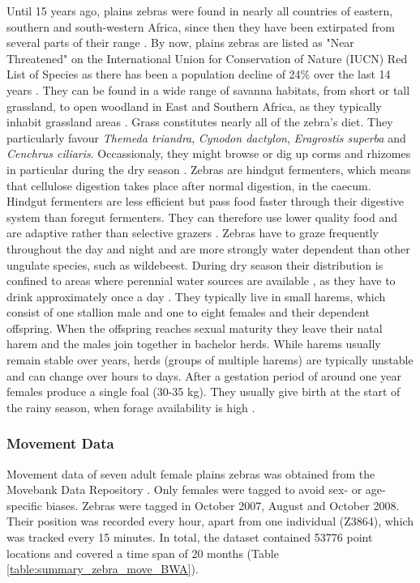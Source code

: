\documentclass[12pt,a4paper, twoside, english]{article}
\begin{document}
Until 15 years ago, plains zebras were found in nearly all countries of eastern, southern and south-western Africa, since then they have been extirpated from several parts of their range \citep{Hack2002}. By now, plains zebras are listed as "Near Threatened" on the International Union for Conservation of Nature (IUCN) Red List of Species as there has been a population decline of 24\% over the last 14 years \citep{King2016}. They can be found in a wide range of savanna habitats, from short or tall grassland, to open woodland in East and Southern Africa, as they typically inhabit grassland areas \citep{McNaughton1986}. Grass constitutes nearly all of the zebra's diet. They particularly favour \textit{Themeda triandra}, \textit{Cynodon dactylon}, \textit{Eragrostis superba} and \textit{Cenchrus ciliaris}. Occassionaly, they might browse or dig up corms and rhizomes in particular during the dry season \citep{Grubb1981}. Zebras are hindgut fermenters, which means that cellulose digestion takes place after normal digestion, in the caecum. Hindgut fermenters are less efficient but pass food faster through their digestive system than foregut fermenters. They can therefore use lower quality food and are adaptive rather than selective grazers \citep{Shorrocks2014}. Zebras have to graze frequently throughout the day and night \citep{Fischhoff2007a} and are more strongly water dependent than other ungulate species, such as wildebeest. During dry season their distribution is confined to areas where perennial water sources are available \citep{Kgathi1993}, as they have to drink approximately once a day \citep{Fischhoff2007a}. They typically live in small harems, which consist of one stallion male and one to eight females and their dependent offspring. When the offspring reaches sexual maturity they leave their natal harem and the males join together in bachelor herds. While harems usually remain stable over years, herds (groups of multiple harems) are typically unstable and can change over hours to days. After a gestation period of around one year females produce a single foal (30-35 kg). They usually give birth at the start of the rainy season, when forage availability is high \citep{Fischhoff2007a, Fischhoff2007b}. 

\subsubsection{Movement Data}

Movement data of seven adult female plains zebras was obtained from the Movebank Data Repository \citep{Bartlam-Brooks2013a}. Only females were tagged to avoid sex- or age-specific biases. Zebras were tagged in October 2007, August and October 2008. Their position was recorded every hour, apart from one individual (Z3864), which was tracked every 15 minutes. In total, the dataset contained 53776 point locations and covered a time span of 20 months (Table \ref{table:summary_zebra_move_BWA}). 
\end{document}

